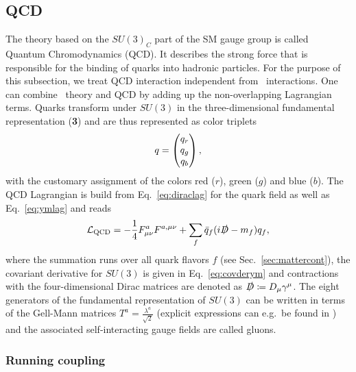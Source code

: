 \subsection{QCD}
The theory based on the $SU(3)_C$ part of the SM gauge group is called
Quantum Chromodynamics (QCD). It describes the strong force that is
responsible for the binding of quarks into hadronic particles. For the
purpose of this subsection, we treat QCD interaction independent from \ew~interactions. One can combine \ew~theory and QCD by adding up
the non-overlapping Lagrangian terms. Quarks transform
under $SU(3)$ in the three-dimensional fundamental representation
(\textbf{3}) and are thus represented as color triplets
\begin{align}
  q = \pmqty{q_r\\q_g\\q_b},
\end{align}
with the customary assignment of the colors red ($r$), green ($g$) and blue ($b$). The QCD Lagrangian
is build from Eq.~\eqref{eq:diraclag} for the quark field as well as
Eq.~\eqref{eq:ymlag} and reads
\begin{align}\label{eq:qcdlag}
  \mathcal{L}_{\text{QCD}} = -\frac{1}{4}F^a_{\mu\nu}F^{a,\mu\nu} + \sum_f
  \bar{q}_f (i \slashed{D}  -m_f) q_f ,
\end{align}
where the summation runs over all quark flavors $f$ (see Sec.~\ref{sec:mattercont}), the covariant derivative for $SU(3)$ is given in Eq.~\eqref{eq:covderym} and contractions with the four-dimensional
Dirac matrices are denoted as $\slashed{D} \coloneqq D_\mu \gamma^\mu$. The eight generators of the fundamental
representation of $SU(3)$ can be written in terms of the Gell-Mann
matrices $T^a = \frac{\lambda^a}{\sqrt{2}}$ (explicit expressions can e.g.\ be
found in \cite{Schwartz:2013pla}) and the associated
self-interacting gauge fields are called gluons. 

\subsubsection{Running coupling}
\label{sec:runcoup}

